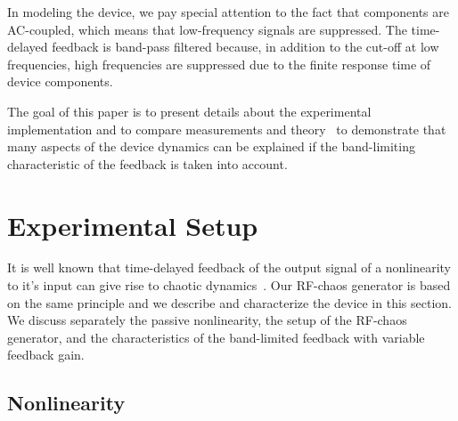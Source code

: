 \documentclass[aps,twocolumn,pre,nofootinbib]{revtex4}
\begin{document}
 
In modeling the device, we pay special attention to the fact that components are AC-coupled, which means that low-frequency signals are suppressed. The time-delayed feedback is band-pass filtered because, in addition to the cut-off at low frequencies, high frequencies are suppressed due to the finite response time of device components. 

The goal of this paper is to present details about the experimental implementation and to compare measurements and theory~\cite{illing2005} to demonstrate that many aspects of the device dynamics can be explained if the band-limiting characteristic of the feedback is taken into account. 


 


\section{Experimental Setup}


It is well known that time-delayed feedback of the output signal of a nonlinearity to it's input can give rise to chaotic dynamics~\cite{Argyris2005,blakely2004Chaos,Mykolaitis2003,Blakely2004QE,Ikeda1982,Celka1997,Udaltsov2002}.
Our RF-chaos generator is based on the same principle and we describe and characterize the device in this section.  
We discuss separately the passive nonlinearity, the setup of the RF-chaos generator, and the characteristics of the band-limited feedback with variable feedback gain.

\subsection{Nonlinearity}
\end{document}
